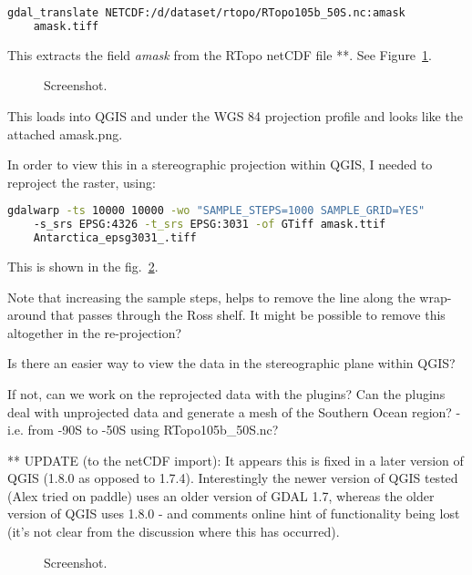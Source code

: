 \begin{example}
  \begin{lstlisting}[language=bash]
  gdal_translate NETCDF:/d/dataset/rtopo/RTopo105b_50S.nc:amask
    amask.tiff
\end{lstlisting}
\end{example}

This extracts the field \emph{amask} from the RTopo netCDF file **. See Figure~\ref{fig:antarctica_mask}.

\begin{figure}[h!]
  \centering
  \caption{Screenshot.}
  \label{fig:antarctica_mask}
\end{figure}

This loads into QGIS and under the WGS 84 projection profile and looks like the attached amask.png.

In order to view this in a stereographic projection within QGIS, I needed to reproject the raster, using:

\begin{example}
  \begin{lstlisting}[language=bash]
  gdalwarp -ts 10000 10000 -wo "SAMPLE_STEPS=1000 SAMPLE_GRID=YES"
    -s_srs EPSG:4326 -t_srs EPSG:3031 -of GTiff amask.ttif
    Antarctica_epsg3031_.tiff
\end{lstlisting}
\end{example}

This is shown in the fig.~\ref{fig:antarctica_epsg}.

Note that increasing the sample steps, helps to remove the line along the wrap-around that passes through the Ross shelf.  It might be possible to remove this altogether in the re-projection?

Is there an easier way to view the data in the stereographic plane within QGIS?

If not, can we work on the reprojected data with the plugins?  Can the plugins deal with unprojected data and generate a mesh of the Southern Ocean region? - i.e. from -90S to -50S using RTopo105b\_50S.nc?

** UPDATE (to the netCDF import): It appears this is fixed in a later version of QGIS (1.8.0 as opposed to 1.7.4).  Interestingly the newer version of QGIS tested (Alex tried on paddle) uses an older version of GDAL 1.7, whereas the older version of QGIS uses 1.8.0 - and comments online hint of functionality being lost (it's not clear from the discussion where this has occurred).


\begin{figure}[h!]
  \centering
  \caption{Screenshot.}
  \label{fig:antarctica_epsg}
\end{figure}
